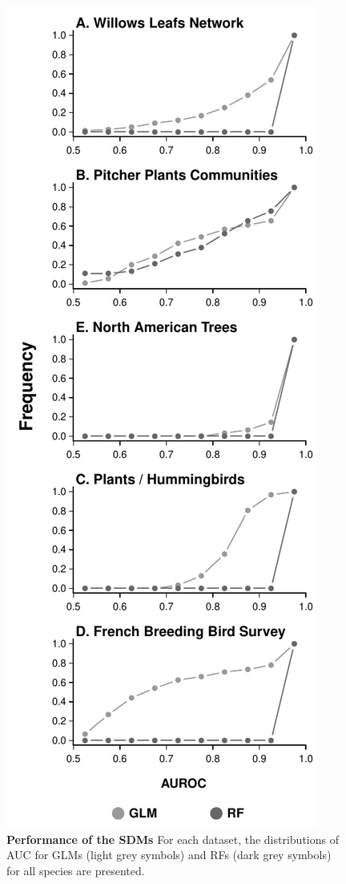 \begin{figure}[htbp]
\centering
\includegraphics[width=.5\textwidth]{chapitre3/figS3.pdf}
\caption[Performance of the SDMs]{\textbf{Performance of the SDMs} For each dataset, the
distributions of AUC for GLMs (light grey symbols) and RFs (dark grey
symbols) for all species are presented.\label{fig:auc}}
\end{figure}

\newpage

